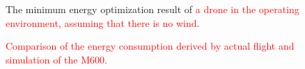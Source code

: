 \documentclass[journal]{./template/IEEEtran}
\begin{document}
\begin{figure}[ht]
\centering
{}
\qquad
{}
\caption{The minimum energy optimization result of \textcolor{red}{a drone in the operating environment, assuming that there is no wind}.}
\label{fig: opt_environ}
\end{figure}

\begin{figure}[ht]
\caption{\textcolor{red}{Comparison of the energy consumption derived by actual flight and simulation of the M600.}}
\label{fig:consumed_energy}
\end{figure}
\end{document}
